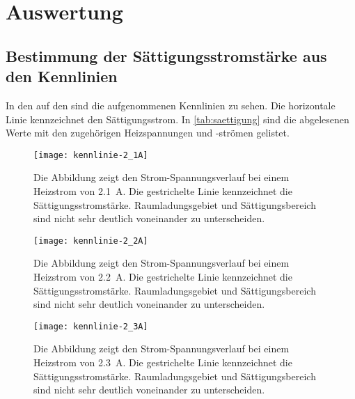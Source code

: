 
\section{Auswertung}

\subsection{Bestimmung der Sättigungsstromstärke aus den Kennlinien}

In den  auf den
 sind die
aufgenommenen Kennlinien zu sehen. Die horizontale Linie kennzeichnet
den Sättigungsstrom. In \cref{tab:saettigung} sind die abgelesenen Werte
mit den zugehörigen Heizspannungen und -strömen gelistet.

\begin{figure}
  \centering
  \texttt{[image: kennlinie-2\_1A]}
  \caption{Die Abbildung zeigt den Strom-Spannungsverlauf bei einem
    Heizstrom von \SI{2.1}{\ampere}. Die gestrichelte Linie kennzeichnet
  die Sättigungsstromstärke. Raumladungsgebiet und Sättigungsbereich
  sind nicht sehr deutlich voneinander zu unterscheiden.}
  \label{fig:kennlinie-2_1A}
\end{figure}

\begin{figure}
  \centering
  \texttt{[image: kennlinie-2\_2A]}
  \caption{Die Abbildung zeigt den Strom-Spannungsverlauf bei einem
    Heizstrom von \SI{2.2}{\ampere}. Die gestrichelte Linie kennzeichnet
    die Sättigungsstromstärke. Raumladungsgebiet und Sättigungsbereich
    sind nicht sehr deutlich voneinander zu unterscheiden.}
  \label{fig:kennlinie-2_2A}
\end{figure}

\begin{figure}
  \centering
  \texttt{[image: kennlinie-2\_3A]}
  \caption{Die Abbildung zeigt den Strom-Spannungsverlauf bei einem
    Heizstrom von \SI{2.3}{\ampere}. Die gestrichelte Linie kennzeichnet
    die Sättigungsstromstärke. Raumladungsgebiet und Sättigungsbereich
    sind nicht sehr deutlich voneinander zu unterscheiden.}
  \label{fig:kennlinie-2_3A}
\end{figure}

